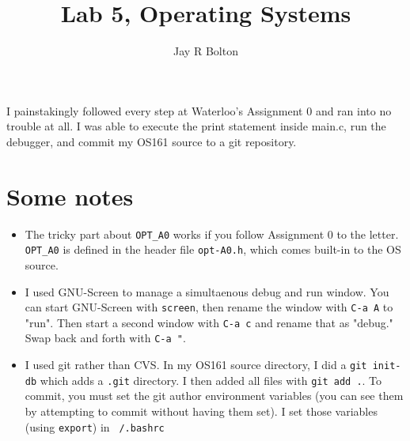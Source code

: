 \documentclass{article}
\title{Lab 5, Operating Systems}
\author{Jay R Bolton}
\begin{document}
\maketitle 

I painstakingly followed every step at Waterloo's Assignment 0 and
ran into no trouble at all. I was able to execute the print statement
inside main.c, run the debugger, and commit my OS161 source to a git
repository.

\section{Some notes}
\begin{itemize}
\item
The tricky part about \texttt{OPT\_A0} works if you follow Assignment 0 to the
letter. \texttt{OPT\_A0} is defined in the header file \texttt{opt-A0.h}, which comes
built-in to the OS source.

\item
I used GNU-Screen to manage a simultaenous debug and run window. You can start
GNU-Screen with \texttt{screen}, then rename the window with \texttt{C-a A} to
"run". Then start a second window with \texttt{C-a c} and rename that as
"debug." Swap back and forth with \texttt{C-a "}.

\item
I used git rather than CVS. In my OS161 source directory, I did a \texttt{git
init-db} which adds a \texttt{.git} directory. I then added all files with
\texttt{git add .}. To commit, you must set the git author environment
variables (you can see them by attempting to commit without having them set). I
set those variables (using \texttt{export}) in \texttt{~/.bashrc}

\end{itemize}
\end{document}

